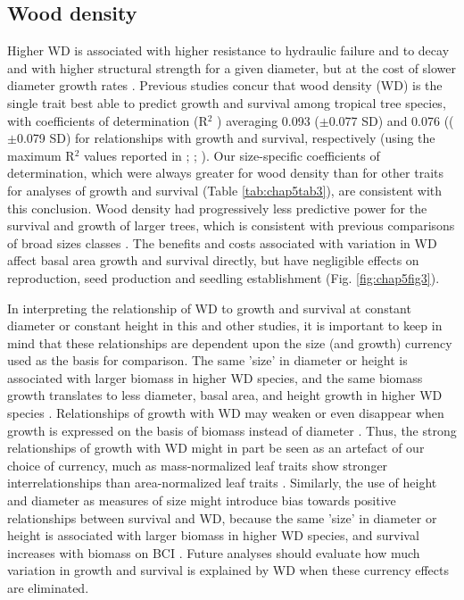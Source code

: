 \documentclass[b5paper,justified]{tufte-book} %
\begin{document}
\begin{fullwidth}
\subsection{Wood density}
Higher WD is associated with higher resistance to hydraulic failure and to decay and with higher structural strength
for a given diameter, but at the cost of slower diameter growth rates \citep[reviewed by][]{Chave2009}. Previous
studies concur that wood density (WD) is the single trait best able to predict growth and survival among tropical
tree species, with coefficients of determination (R$^2$ ) averaging 0.093 ($\pm$0.077 SD) and 0.076 (($\pm$0.079 SD) for relationships with growth and survival, respectively (using the maximum R$^2$ values reported in \citealt{Poorter2008}; \citealt{Wright2010}; \citealt{Iida2014,Iida2014a}). Our size-specific coefficients of determination, which were always greater for wood density than for other traits for analyses of growth and survival (Table \ref{tab:chap5tab3}), are consistent with this conclusion. Wood density had progressively less predictive power for the survival and growth of larger trees, which is consistent with previous comparisons of broad sizes classes \citep{Poorter2008, Wright2010}. The benefits and costs associated with variation in WD affect basal area growth and survival directly, but have negligible effects on reproduction, seed production and seedling establishment (Fig. \ref{fig:chap5fig3}).

In interpreting the relationship of WD to growth and survival at constant diameter or constant height in this and
other studies, it is important to keep in mind that these relationships are dependent upon the size (and growth) currency used as the basis for comparison. The same 'size' in diameter or height is associated with larger biomass in
higher WD species, and the same biomass growth translates to less diameter, basal area, and height growth in higher
WD species \citep{Larjavaara2010}. Relationships of growth with WD may weaken or even disappear when growth is expressed on the basis of biomass instead of diameter \citep{Rueger2012}. Thus, the strong relationships
of growth with WD might in part be seen as an artefact of our choice of currency, much as mass-normalized leaf traits
show stronger interrelationships than area-normalized leaf traits \citep{Osnas2013}. Similarly, the use of height and
diameter as measures of size might introduce bias towards positive relationships between survival and WD, because
the same 'size' in diameter or height is associated with larger biomass in higher WD species, and survival increases
with biomass on BCI \citep{Muller-Landau2006}. Future analyses should evaluate how much variation in growth
and survival is explained by WD when these currency effects are eliminated.


\end{fullwidth}
\end{document}

